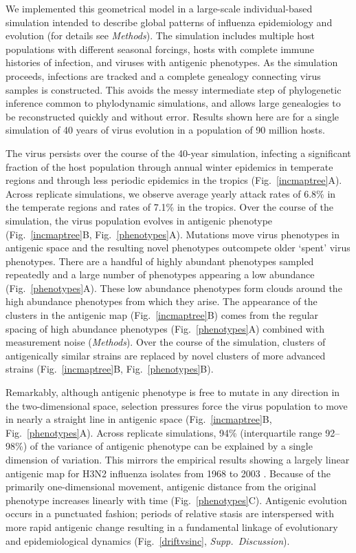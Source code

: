 We implemented this geometrical model in a large-scale individual-based simulation intended to describe global patterns of influenza epidemiology and evolution (for details see \textsl{Methods}).  The simulation includes multiple host populations with different seasonal forcings, hosts with complete immune histories of infection, and viruses with antigenic phenotypes.  As the simulation proceeds, infections are tracked and a complete genealogy connecting virus samples is constructed.  This avoids the messy intermediate step of phylogenetic inference common to phylodynamic simulations, and allows large genealogies to be reconstructed quickly and without error.  Results shown here are for a single simulation of 40 years of virus evolution in a population of 90 million hosts.  

The virus persists over the course of the 40-year simulation, infecting a significant fraction of the host population through annual winter epidemics in temperate regions and through less periodic epidemics in the tropics (Fig.~\ref{incmaptree}A).  Across replicate simulations, we observe average yearly attack rates of 6.8\% in the temperate regions and rates of 7.1\% in the tropics.  Over the course of the simulation, the virus population evolves in antigenic phenotype (Fig.~\ref{incmaptree}B, Fig.~\ref{phenotypes}A).  Mutations move virus phenotypes in antigenic space and the resulting novel phenotypes outcompete older `spent' virus phenotypes.  There are a handful of highly abundant phenotypes sampled repeatedly and a large number of phenotypes appearing a low abundance (Fig.~\ref{phenotypes}A).  These low abundance phenotypes form clouds around the high abundance phenotypes from which they arise.  The appearance of the clusters in the antigenic map (Fig.~\ref{incmaptree}B) comes from the regular spacing of high abundance phenotypes (Fig.~\ref{phenotypes}A) combined with measurement noise (\textsl{Methods}).  Over the course of the simulation, clusters of antigenically similar strains are replaced by novel clusters of more advanced strains (Fig.~\ref{incmaptree}B, Fig.~\ref{phenotypes}B).  

Remarkably, although antigenic phenotype is free to mutate in any direction in the two-dimensional space, selection pressures force the virus population to move in nearly a straight line in antigenic space (Fig.~\ref{incmaptree}B, Fig.~\ref{phenotypes}A).  Across replicate simulations, 94\% (interquartile range 92--98\%) of the variance of antigenic phenotype can be explained by a single dimension of variation.  This mirrors the empirical results showing a largely linear antigenic map for H3N2 influenza isolates from 1968 to 2003 \cite{Smith04}.  Because of the primarily one-dimensional movement, antigenic distance from the original phenotype increases linearly with time (Fig.~\ref{phenotypes}C).  Antigenic evolution occurs in a punctuated fashion; periods of relative stasis are interspersed with more rapid antigenic change resulting in a fundamental linkage of evolutionary and epidemiological dynamics (Fig.~\ref{driftvsinc}, \textsl{Supp.~Discussion}).

